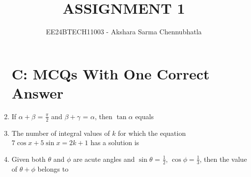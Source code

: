 \documentclass[journal,12pt,twocolumn,article]{IEEEtran}
\theoremstyle{remark}
\begin{document}
\begin{enumerate}[start = 20]

\vspace{3cm}
\title{ASSIGNMENT 1}
\author{EE24BTECH11003 - Akshara Sarma Chennubhatla}
\maketitle
\newpage
\bigskip
\section*{C: MCQs With One Correct Answer}
\item If $\alpha + \beta$ = $\frac{\pi}{2}$ and $\beta + \gamma$ = $\alpha$, then $\tan \alpha$ equals
\hfill{}
\begin{enumerate}
\end{enumerate}
\item The number of integral values of $k$ for which the equation $7\cos x + 5\sin x = 2k+1$ has a solution is
\hfill{}
\begin{enumerate}
\end{enumerate}
\item Given both $\theta$ and $\phi$ are acute angles and $\sin\theta$ = $\frac{1}{2}$, $\cos\phi = \frac{1}{3}$, then the value of $\theta + \phi$ belongs to
\hfill{}
\begin{enumerate}
\begin{multicols}{2}
\item $(\frac{\pi}{3},\frac{\pi}{2}]$
\columnbreak

\end{multicols}
\end{enumerate}
\end{enumerate}
\end{document}

